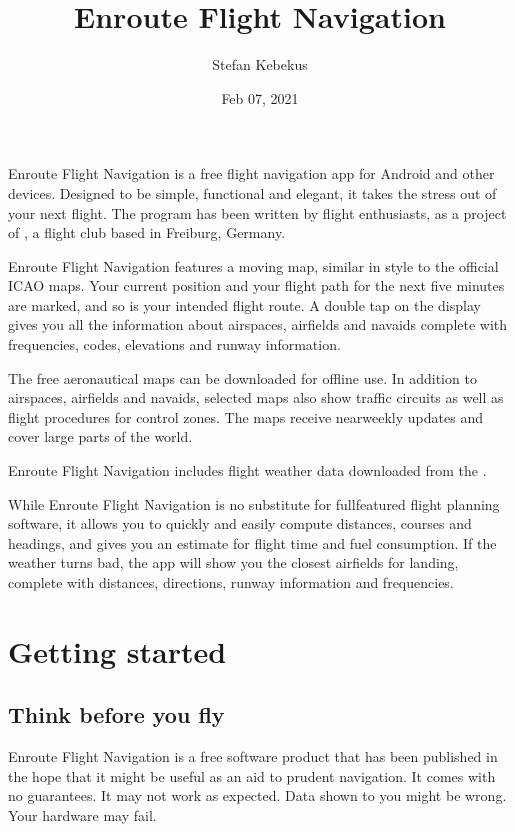 \documentclass[letterpaper,10pt,english]{sphinxmanual}
\title{Enroute Flight Navigation}
\date{Feb 07, 2021}
\author{Stefan Kebekus}
\let\sphinxpxdimen\pdfpxdimen\else\newdimen\sphinxpxdimen
\begin{document}
\pagestyle{empty}
\sphinxmaketitle
\pagestyle{plain}
\sphinxtableofcontents
\pagestyle{normal}
\label{\detokenize{index::doc}}


\noindent{\hspace*{\fill}\sphinxincludegraphics[width=100\sphinxpxdimen]{{de.akaflieg_freiburg.enroute}.png}\hspace*{\fill}}

Enroute Flight Navigation is a free flight navigation app for Android and other
devices. Designed to be simple, functional and elegant, it takes the stress out
of your next flight. The program has been written by flight enthusiasts, as a
project of , a flight club
based in Freiburg, Germany.

Enroute Flight Navigation features a moving map, similar in style to the
official ICAO maps. Your current position and your flight path for the next five
minutes are marked, and so is your intended flight route. A double tap on the
display gives you all the information about airspaces, airfields and navaids \textendash{}
complete with frequencies, codes, elevations and runway information.

The free aeronautical maps can be downloaded for offline use. In addition to
airspaces, airfields and navaids, selected maps also show traffic circuits as
well as flight procedures for control zones. The maps receive near\sphinxhyphen{}weekly
updates and cover large parts of the world.

Enroute Flight Navigation includes flight weather data downloaded from the
.

While Enroute Flight Navigation is no substitute for full\sphinxhyphen{}featured flight
planning software, it allows you to quickly and easily compute distances,
courses and headings, and gives you an estimate for flight time and fuel
consumption. If the weather turns bad, the app will show you the closest
airfields for landing, complete with distances, directions, runway information
and frequencies.

\part{Getting started}


\chapter{Think before you fly}
\label{\detokenize{01-intro/think:think-before-you-fly}}\label{\detokenize{01-intro/think::doc}}
Enroute Flight Navigation is a free software product that has been published in
the hope that it might be useful as an aid to prudent navigation.  It comes with
no guarantees.  It may not work as expected.  Data shown to you might be wrong.
Your hardware may fail.
\end{document}

